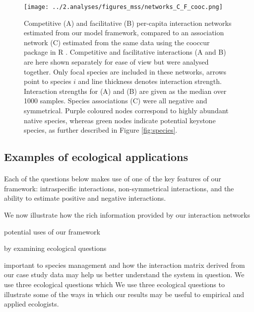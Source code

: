 \documentclass[a4,12pt]{article}
\begin{document}
       \begin{figure}[H]
        \begin{centering}
        \texttt{[image: ../2.analyses/figures\_mss/networks\_C\_F\_cooc.png]}
        \caption{Competitive (A) and facilitative (B) per-capita interaction networks estimated from our model framework, compared to an association network (C) estimated from the same data using the cooccur package in R \parencite{Griffith2016}. Competitive and facilitative interactions (A and B) are here shown separately for ease of view but were analysed together. Only focal species are included in these networks, arrows point to species $i$ and line thickness denotes interaction strength. Interaction strengths for (A) and (B) are given as the median over 1000 samples. Species associations (C) were all negative and symmetrical. Purple coloured nodes correspond to highly abundant native species, whereas green nodes indicate potential keystone species, as further described in Figure \ref{fig:species}.}
        \label{fig:netwks}
       \end{centering}
    \end{figure}    



    \subsection{Examples of ecological applications}

    \paragraph{}
    Each of the questions below makes use of one of the key features of our framework: intraspecific interactions, non-symmetrical interactions, and the ability to estimate positive and negative interactions. 


    We now illustrate how the rich information provided by our interaction networks 

    potential uses of our framework 



    by examining ecological questions 



    important to species management and how the interaction matrix derived from our case study data may help us better understand the system in question. We use three ecological questions which 
    We use three ecological questions to illustrate some of the ways in which our results may be useful to empirical and applied ecologists.
 
\end{document}
